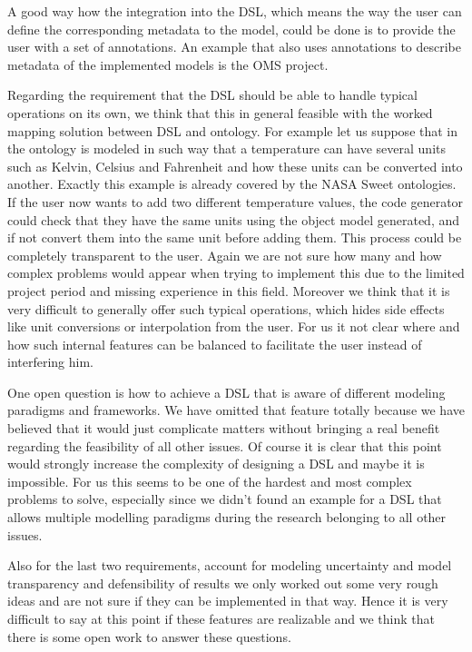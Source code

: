A good way how the integration into the DSL, which means the way the user can define the corresponding metadata to the model, could be done is to provide the user with a set of annotations. An example that also uses annotations to describe metadata of the implemented models is the OMS project.
\par
Regarding the requirement that the DSL should be able to handle typical operations on its own, we think that this in general feasible with the worked mapping solution between DSL and ontology. For example let us suppose that in the ontology is modeled in such way that a temperature can have several units such as Kelvin, Celsius and Fahrenheit and how these units can be converted into another. Exactly this example is already covered by the NASA Sweet ontologies. If the user now wants to add two different temperature values, the code generator could check that they have the same units using the object model generated, and if not convert them into the same unit before adding them. This process could be completely transparent to the user. Again we are not sure how many and how complex problems would appear when trying to implement this due to the limited project period and missing experience in this field. Moreover we think that it is very difficult to generally offer such typical operations, which hides side effects like unit conversions or interpolation from the user. For us it not clear where and how such internal features can be balanced to facilitate the user instead of interfering him.
\par
One open question is how to achieve a DSL that is aware of different modeling paradigms and frameworks. We have omitted that feature totally because we have believed that it would just complicate matters without bringing a real benefit regarding the feasibility of all other issues. Of course it is clear that this point would strongly increase the complexity of designing a DSL and maybe it is impossible. For us this seems to be one of the hardest and most complex problems to solve, especially since we didn’t found an example for a DSL that allows multiple modelling paradigms during the research belonging to all other issues.
\par
Also for the last two requirements, account for modeling uncertainty and model transparency and defensibility of results we only worked out some very rough ideas and are not sure if they can be implemented in that way. Hence it is very difficult to say at this point if these features are realizable and we think that there is some open work to answer these questions.
